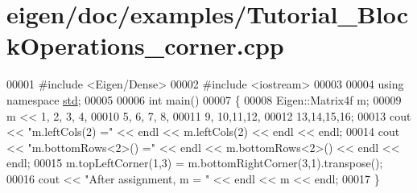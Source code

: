 \hypertarget{eigen_2doc_2examples_2_tutorial___block_operations__corner_8cpp_source}{}\section{eigen/doc/examples/\+Tutorial\+\_\+\+Block\+Operations\+\_\+corner.cpp}
\label{eigen_2doc_2examples_2_tutorial___block_operations__corner_8cpp_source}

\begin{DoxyCode}
00001 \textcolor{preprocessor}{#include <Eigen/Dense>}
00002 \textcolor{preprocessor}{#include <iostream>}
00003 
00004 \textcolor{keyword}{using namespace }\hyperlink{namespacestd}{std};
00005 
00006 \textcolor{keywordtype}{int} main()
00007 \{
00008   Eigen::Matrix4f m;
00009   m << 1, 2, 3, 4,
00010        5, 6, 7, 8,
00011        9, 10,11,12,
00012        13,14,15,16;
00013   cout << \textcolor{stringliteral}{"m.leftCols(2) ="} << endl << m.leftCols(2) << endl << endl;
00014   cout << \textcolor{stringliteral}{"m.bottomRows<2>() ="} << endl << m.bottomRows<2>() << endl << endl;
00015   m.topLeftCorner(1,3) = m.bottomRightCorner(3,1).transpose();
00016   cout << \textcolor{stringliteral}{"After assignment, m = "} << endl << m << endl;
00017 \}
\end{DoxyCode}
